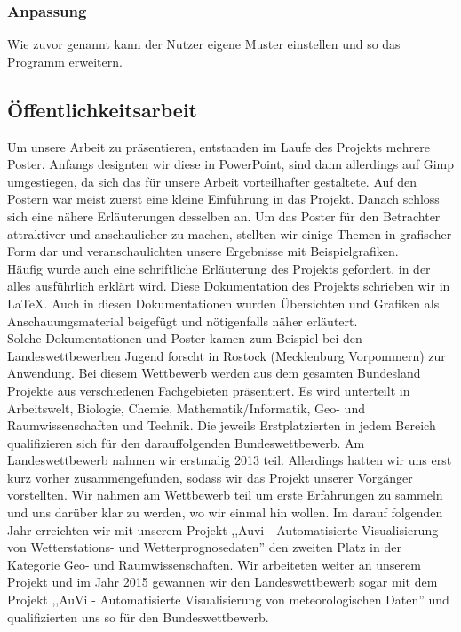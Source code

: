 \documentclass[a4paper,oneside,12pt,titlepage]{article}
\newcommand{\jf}{Jugend forscht }
\begin{document}
\subsubsection{Anpassung} %
Wie zuvor genannt kann der Nutzer eigene Muster einstellen und so das Programm erweitern.

\subsection{Öffentlichkeitsarbeit} %
Um unsere Arbeit zu präsentieren, entstanden im Laufe des Projekts mehrere Poster. Anfangs designten wir diese in PowerPoint, sind dann allerdings auf Gimp umgestiegen, da sich das für unsere Arbeit vorteilhafter gestaltete. Auf den Postern war meist zuerst eine kleine Einführung in das Projekt. Danach schloss sich eine nähere Erläuterungen desselben an. Um das Poster für den Betrachter attraktiver und anschaulicher zu machen, stellten wir einige Themen in grafischer Form dar und veranschaulichten unsere Ergebnisse mit Beispielgrafiken. \\
Häufig wurde auch eine schriftliche Erläuterung des Projekts gefordert, in der alles ausführlich erklärt wird. Diese Dokumentation des Projekts schrieben wir in \LaTeX . Auch in diesen Dokumentationen wurden Übersichten und Grafiken als Anschauungsmaterial beigefügt und nötigenfalls näher erläutert.\\
Solche Dokumentationen und Poster kamen zum Beispiel bei den Landeswettbewerben \jf in Rostock (Mecklenburg Vorpommern) zur Anwendung. Bei diesem Wettbewerb werden aus dem gesamten Bundesland Projekte aus verschiedenen Fachgebieten präsentiert. Es wird unterteilt in Arbeitswelt, Biologie, Chemie, Mathematik/Informatik, Geo- und Raumwissenschaften und Technik. Die jeweils Erstplatzierten in jedem Bereich qualifizieren sich für den darauffolgenden Bundeswettbewerb. Am Landeswettbewerb nahmen wir erstmalig 2013 teil. Allerdings hatten wir uns erst kurz vorher zusammengefunden, sodass wir das Projekt unserer Vorgänger vorstellten. Wir nahmen am Wettbewerb teil um erste Erfahrungen zu sammeln und uns darüber klar zu werden, wo wir einmal hin wollen. Im darauf folgenden Jahr erreichten wir mit unserem Projekt ,,Auvi - Automatisierte Visualisierung von Wetterstations- und Wetterprognosedaten'' den zweiten Platz in der Kategorie Geo- und Raumwissenschaften. Wir arbeiteten weiter an unserem Projekt und im Jahr 2015 gewannen wir den Landeswettbewerb sogar mit dem Projekt ,,AuVi - Automatisierte Visualisierung von meteorologischen Daten'' und qualifizierten uns so für den Bundeswettbewerb.\\
\end{document}
